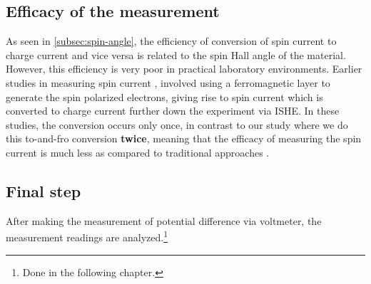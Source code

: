 \subsection{Efficacy of the measurement}

As seen in \cref{subsec:spin-angle}, the efficiency of conversion of spin current to charge current and vice versa is related to the spin Hall angle of the material.
However, this efficiency is very poor in practical laboratory environments.
Earlier studies in measuring spin current \cite{valenzuela2007electrical}, involved using a ferromagnetic layer to generate the spin polarized electrons, giving rise to spin current which is converted to charge current further down the experiment via ISHE.
In these studies, the conversion occurs only once, in contrast to our study where we do this to-and-fro conversion \textbf{twice}, meaning that the efficacy of measuring the spin current is much less as compared to traditional approaches \cite{valenzuela2007electrical}.

\subsection{Final step}

After making the measurement of potential difference via voltmeter, the measurement readings are analyzed.\footnote{Done in the following chapter.}

